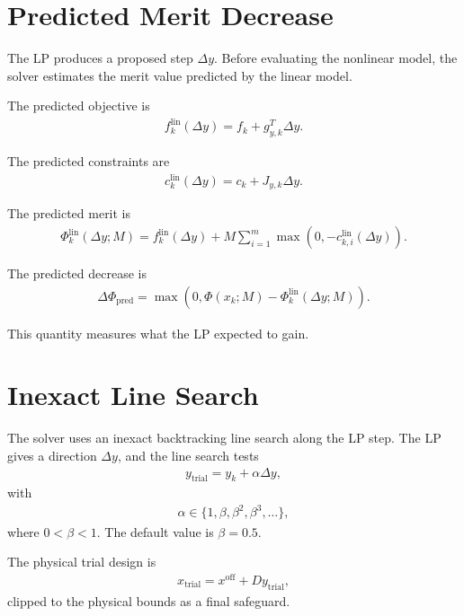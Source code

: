 \documentclass[11pt,a4paper]{article}
\begin{document}
\section{Predicted Merit Decrease}

The LP produces a proposed step \(\Delta y\). Before evaluating the nonlinear
model, the solver estimates the merit value predicted by the linear model.

The predicted objective is
\begin{align}
    f_k^{\text{lin}}(\Delta y) = f_k + g_{y,k}^T \Delta y.
\end{align}

The predicted constraints are
\begin{align}
    c_k^{\text{lin}}(\Delta y) = c_k + J_{y,k}\Delta y.
\end{align}

The predicted merit is
\begin{align}
    \Phi_k^{\text{lin}}(\Delta y; M)
    =
    f_k^{\text{lin}}(\Delta y)
    +
    M \sum_{i=1}^{m}
    \max\left(0, -c_{k,i}^{\text{lin}}(\Delta y)\right).
\end{align}

The predicted decrease is
\begin{align}
    \Delta \Phi_{\text{pred}}
    =
    \max\left(
        0,
        \Phi(x_k; M) - \Phi_k^{\text{lin}}(\Delta y; M)
    \right).
\end{align}

This quantity measures what the LP expected to gain.

\section{Inexact Line Search}

The solver uses an inexact backtracking line search along the LP step. The LP
gives a direction \(\Delta y\), and the line search tests
\begin{align}
    y_{\text{trial}} = y_k + \alpha \Delta y,
\end{align}
with
\begin{align}
    \alpha \in \{1, \beta, \beta^2, \beta^3,\dots\},
\end{align}
where \(0 < \beta < 1\). The default value is \(\beta = 0.5\).

The physical trial design is
\begin{align}
    x_{\text{trial}} = x^{\text{off}} + D y_{\text{trial}},
\end{align}
clipped to the physical bounds as a final safeguard.
\end{document}
